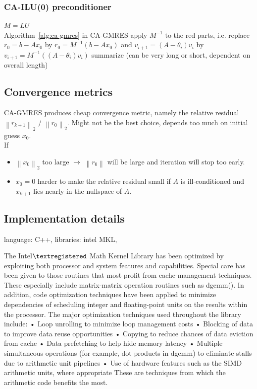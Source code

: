 \documentclass{scrartcl}
\newcommand{\norm}[1]{\left\lVert#1\right\rVert}
\begin{document}
\subsubsection{CA-ILU(0) preconditioner} \label{sec:ca-ilu}
$M = LU$ \\
Algorithm~\ref{alg:ca-gmres} in CA-GMRES apply $M^{-1}$ to the red parts, i.e. replace $r_0 = b - Ax_0$ by $r_0 = M^{-1}(b - Ax_0)$ and  $v_{i + 1} = (A - \theta_i)v_i$ by $v_{i + 1} = M^{-1}((A - \theta_i)v_i)$
summarize \cite{Grigori} (can be very long or short, dependent on overall length)
\subsection{Convergence metrics}
CA-GMRES produces cheap convergence metric, namely the relative residual $\norm{r_{k+1}}_2$ / $\norm{r_0}_2$. Might not be the best choice, depends too much on initial guess $x_0$.\\

If 
\begin{itemize}
\item $\norm{x_0}_2$ too large $\rightarrow$ $\norm{r_0}$ will be large and iteration will stop too early.
\item $x_0 = 0$ harder to make the relative residual small if $A$ is ill-conditioned and $x_{k+1}$ lies nearly in the nullspace of $A$.
\end{itemize}
\subsection{Implementation details}
language: C++, libraries: intel MKL,

The Intel$\textregistered$ Math Kernel Library has been optimized by exploiting both processor and system features and
capabilities. Special care has been given to those routines that most profit from cache-management
techniques. These especially include matrix-matrix operation routines such as dgemm().
In addition, code optimization techniques have been applied to minimize dependencies of scheduling integer
and floating-point units on the results within the processor.
The major optimization techniques used throughout the library include:
• Loop unrolling to minimize loop management costs
• Blocking of data to improve data reuse opportunities
• Copying to reduce chances of data eviction from cache
• Data prefetching to help hide memory latency
• Multiple simultaneous operations (for example, dot products in dgemm) to eliminate stalls due to
arithmetic unit pipelines
• Use of hardware features such as the SIMD arithmetic units, where appropriate
These are techniques from which the arithmetic code benefits the most.
\end{document}
